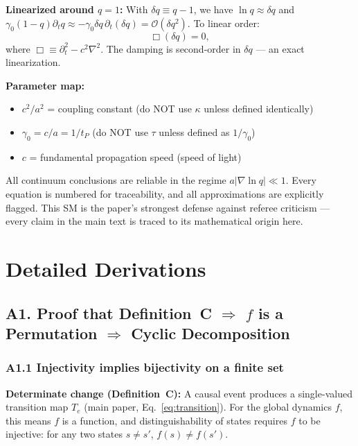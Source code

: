 \documentclass[reprint]{revtex4-2}
\begin{document}
\textbf{Linearized around $q=1$:} With $\delta q \equiv q-1$, we have $\ln q \approx \delta q$ and $\gamma_0(1-q)\partial_t q \approx -\gamma_0\delta q\,\partial_t(\delta q) = \mathcal{O}(\delta q^2)$. To linear order:
\begin{equation}
\boxed{\Box(\delta q) = 0},
\label{eq:linearized_exact}
\end{equation}
where $\Box \equiv \partial_t^2 - c^2\nabla^2$. The damping is second-order in $\delta q$ --- an exact linearization.

\textbf{Parameter map:}
\begin{itemize}
\item $c^2/a^2$ = coupling constant (do NOT use $\kappa$ unless defined identically)
\item $\gamma_0 = c/a = 1/t_P$ (do NOT use $\tau$ unless defined as $1/\gamma_0$)
\item $c$ = fundamental propagation speed (speed of light)
\end{itemize}

All continuum conclusions are reliable in the regime $a|\nabla\ln q| \ll 1$. Every equation is numbered for traceability, and all approximations are explicitly flagged. This SM is the paper's strongest defense against referee criticism --- every claim in the main text is traced to its mathematical origin here.

\section{Detailed Derivations}

\subsection{A1. Proof that Definition~C $\Rightarrow$ $f$ is a Permutation $\Rightarrow$ Cyclic Decomposition}

\subsubsection{A1.1 Injectivity implies bijectivity on a finite set}

\textbf{Determinate change (Definition~C):} A causal event produces a single-valued transition map $T_e$ (main paper, Eq.~\ref{eq:transition}). For the global dynamics $f$, this means $f$ is a function, and distinguishability of states requires $f$ to be injective: for any two states $s\neq s'$, $f(s)\neq f(s')$.
\end{document}
